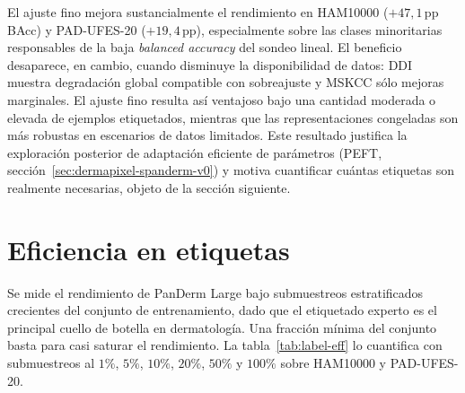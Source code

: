 El ajuste fino mejora sustancialmente el rendimiento en HAM10000
($+47{,}1$\,pp BAcc) y PAD-UFES-20 ($+19{,}4$\,pp), especialmente
sobre las clases minoritarias responsables de la baja \emph{balanced
accuracy} del sondeo lineal. El beneficio desaparece, en cambio, cuando
disminuye la disponibilidad de datos: DDI muestra degradación global
compatible con sobreajuste y MSKCC sólo mejoras marginales. El ajuste
fino resulta así ventajoso bajo una cantidad moderada o elevada de
ejemplos etiquetados, mientras que las representaciones congeladas son
más robustas en escenarios de datos limitados. Este resultado justifica
la exploración posterior de adaptación eficiente de parámetros (PEFT,
sección~\ref{sec:dermapixel-spanderm-v0}) y motiva cuantificar cuántas
etiquetas son realmente necesarias, objeto de la sección siguiente.

\section{Eficiencia en etiquetas}
\label{sec:label-eff-results}

Se mide el rendimiento de PanDerm Large bajo submuestreos
estratificados crecientes del conjunto de entrenamiento, dado que el
etiquetado experto es el principal cuello de botella en dermatología.
Una fracción mínima del conjunto basta para casi saturar el
rendimiento. La tabla~\ref{tab:label-eff} lo cuantifica con
submuestreos al $1\%$,
$5\%$, $10\%$, $20\%$, $50\%$ y $100\%$ sobre HAM10000 y
PAD-UFES-20.

